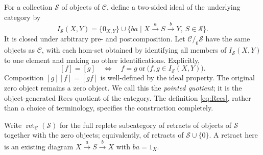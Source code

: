 \documentclass[11pt,reqno,a4paper]{amsart}
\theoremstyle{definition}
\theoremstyle{remark}
\newcommand{\C}{\mathcal{C}}
\newcommand{\0}{\mathbf{0}}
\renewcommand{\1}{\mathbf{1}}
\newcommand{\Scl}{\mathcal S}
\newcommand{\pq}[2]{#1/_{\!0}#2}
\DeclareMathOperator{\ret}{ret}
\begin{document}
For a collection $\Scl$ of objects of $\C$, define a two-sided ideal
of the underlying category by
\begin{equation}\label{eq:pointedideal}
 I_{\Scl}(X,Y)=\{0_{X,Y}\}\cup
 \{ba\mid X\xrightarrow{a}S\xrightarrow{b}Y,\ S\in\Scl\}.
\end{equation}
It is closed under arbitrary pre- and postcomposition. Let
$\pq{\C}{\Scl}$ have the same objects as $\C$, with each hom-set
obtained by identifying all members of $I_{\Scl}(X,Y)$ to one element
and making no other identifications. Explicitly,
\begin{equation}\label{eq:Rees}
 [f]=[g]\quad\Longleftrightarrow\quad
 f=g\ \text{or}\ \bigl(f,g\in I_{\Scl}(X,Y)\bigr).
\end{equation}
Composition $[g][f]=[gf]$ is well-defined by the ideal property. The
original zero object remains a zero object. We call this the
\emph{pointed quotient}; it is the object-generated Rees quotient of
the category. The definition \eqref{eq:Rees}, rather than a choice of
terminology, specifies the construction completely.

Write $\ret_{\C}(\Scl)$ for the full replete subcategory of retracts
of objects of $\Scl$ together with the zero objects; equivalently, of
retracts of $\Scl\cup\{0\}$. A retract here is an existing diagram
$X\xrightarrow{a}S\xrightarrow{b}X$ with $ba=1_X$.
\end{document}
